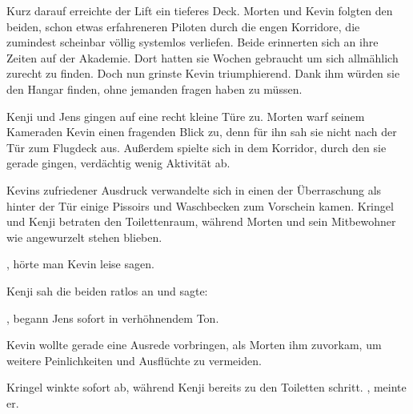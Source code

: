 \par

Kurz darauf erreichte der Lift ein tieferes Deck. Morten und Kevin folgten den beiden, schon etwas erfahreneren Piloten durch die engen Korridore, die zumindest scheinbar völlig systemlos verliefen. Beide erinnerten sich an ihre Zeiten auf der Akademie. Dort hatten sie Wochen gebraucht um sich allmählich zurecht zu finden. Doch nun grinste Kevin triumphierend. Dank ihm würden sie den Hangar finden, ohne jemanden fragen haben zu müssen.

\par

Kenji und Jens gingen auf eine recht kleine Türe zu. Morten warf seinem Kameraden Kevin einen fragenden Blick zu, denn für ihn sah sie nicht nach der Tür zum Flugdeck aus. Außerdem spielte sich in dem Korridor, durch den sie gerade gingen, verdächtig wenig Aktivität ab.

\par

Kevins zufriedener Ausdruck verwandelte sich in einen der Überraschung als hinter der Tür einige Pissoirs und Waschbecken zum Vorschein kamen. Kringel und Kenji betraten den Toilettenraum, während Morten und sein Mitbewohner wie angewurzelt stehen blieben.

\par

, hörte man Kevin leise sagen.

\par

Kenji sah die beiden ratlos an und sagte: 

\par

, begann Jens sofort in verhöhnendem Ton. 

\par

Kevin wollte gerade eine Ausrede vorbringen, als Morten ihm zuvorkam, um weitere Peinlichkeiten und Ausflüchte zu vermeiden. 

\par

Kringel winkte sofort ab, während Kenji bereits zu den Toiletten schritt. , meinte er. 

